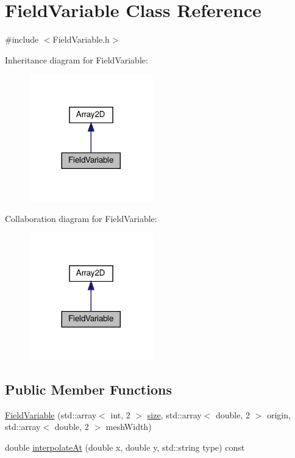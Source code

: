 \hypertarget{classFieldVariable}{}\section{Field\+Variable Class Reference}
\label{classFieldVariable}


{\ttfamily \#include $<$Field\+Variable.\+h$>$}



Inheritance diagram for Field\+Variable\+:\nopagebreak
\begin{figure}[H]
\begin{center}
\leavevmode
\includegraphics[width=152pt]{classFieldVariable__inherit__graph}
\end{center}
\end{figure}


Collaboration diagram for Field\+Variable\+:\nopagebreak
\begin{figure}[H]
\begin{center}
\leavevmode
\includegraphics[width=152pt]{classFieldVariable__coll__graph}
\end{center}
\end{figure}
\subsection*{Public Member Functions}
\begin{DoxyCompactItemize}
\item 
\mbox{\hyperlink{classFieldVariable_aa0985778bc6331b74904a03c3ef67a98}{Field\+Variable}} (std\+::array$<$ int, 2 $>$ \mbox{\hyperlink{classArray2D_accf87be860645d6c50d6ba6fa39ec6f9}{size}}, std\+::array$<$ double, 2 $>$ origin, std\+::array$<$ double, 2 $>$ mesh\+Width)
\item 
double \mbox{\hyperlink{classFieldVariable_aa48ebd10eadb5e604d92de54943b3e3f}{interpolate\+At}} (double x, double y, std\+::string type) const
\end{DoxyCompactItemize}
